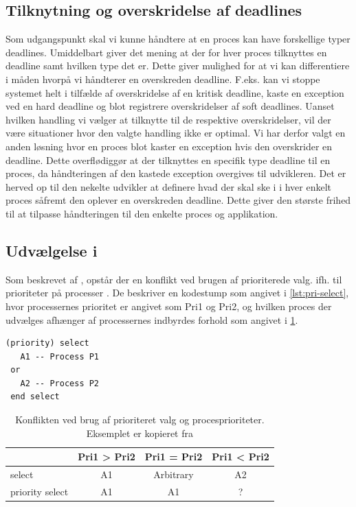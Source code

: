 \subsection{Tilknytning og overskridelse af deadlines}
Som udgangspunkt skal vi kunne håndtere at en proces kan have forskellige typer deadlines. Umiddelbart giver det mening at der for hver proces tilknyttes en deadline samt hvilken type det er. Dette giver mulighed for at vi kan differentiere i måden hvorpå vi håndterer en overskreden deadline. F.eks. kan vi stoppe systemet helt i tilfælde af overskridelse af en kritisk deadline, kaste en exception ved en hard deadline og blot registrere overskridelser af soft deadlines. Uanset hvilken handling vi vælger at tilknytte til de respektive overskridelser, vil der være situationer hvor den valgte handling ikke er optimal. Vi har derfor valgt en anden løsning hvor en proces blot kaster en exception hvis den overskrider en deadline. Dette overflødiggør at der tilknyttes en specifik type deadline til en proces, da håndteringen af den kastede exception overgives til udvikleren. Det er herved op til den nekelte udvikler at definere hvad der skal ske i i hver enkelt proces såfremt den oplever en overskreden deadline. Dette giver den største frihed til at tilpasse håndteringen til den enkelte proces og applikation. 

\subsection{Udvælgelse i }
Som  beskrevet af \citeauthor{Burns1990}, opstår der en konflikt ved brugen af  prioriterede valg. ifh. til prioriteter på processer \cite{Burns1990}. De beskriver en kodestump som angivet i \cref{lst:pri-select}, hvor processernes prioritet er angivet som Pri1 og Pri2, og hvilken proces der udvælges afhænger af processernes indbyrdes forhold som angivet i \cref{tab:prioritizedSelect}.


\begin{lstlisting}[firstnumber=1 ,float=hbtp, label=lst:pri-select, caption={(priority) select. Eksemplet er kopieret fra \cite{Burns1990}}]
(priority) select
   A1 -- Process P1
 or
   A2 -- Process P2
 end select
\end{lstlisting}

\begin{table}[htbp]
	\centering
	\begin{tabular}{lccc}
       	\toprule
        &Pri1 > Pri2 & Pri1 = Pri2 & Pri1 < Pri2\\
        \midrule
          	select          & A1 & Arbitrary    & A2 \\
		    priority select & A1 & A1           & ? \\    
        \bottomrule
        \end{tabular}
    \caption[]{Konflikten ved brug af prioriteret valg og procesprioriteter. Eksemplet er kopieret fra \cite[160]{Burns1990}}\\
    \label{tab:prioritizedSelect}
\end{table}

